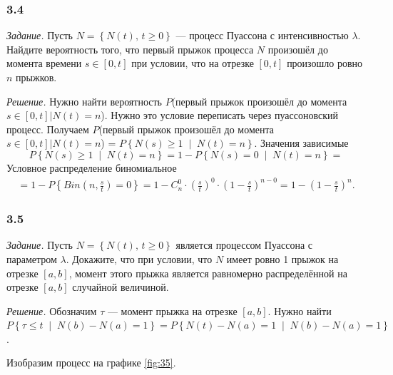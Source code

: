 \subsubsection*{3.4}

\textit{Задание.}
Пусть $N = \left\{ N \left( t \right), \, t \geq 0 \right\} $ ---
процесс Пуассона с интенсивностью $ \lambda $.
Найдите вероятность того, что первый прыжок процесса $N$ произошёл до момента времени
$s \in \left[ 0, t \right] $ при условии,
что на отрезке $ \left[ 0, t \right] $ произошло ровно $n$ прыжков.

\textit{Решение.}
Нужно найти вероятность $P$(первый прыжок произошёл до момента
$\left. s \in \left[ 0, t \right] \right| N \left( t \right) = n$).
Нужно это условие переписать через пуассоновский процесс.
Получаем
$P$(первый прыжок произошёл до момента
  $\left. s \in \left[ 0, t \right] \right| N \left( t \right) = n$) =
  $P \left\{ N \left( s \right) \geq 1 \; \middle| \; N \left( t \right) = n \right\} $.
Значения зависимые
$$P \left\{ N \left( s \right) \geq 1 \; \middle| \; N \left( t \right) = n \right\} =
  1 - P \left\{ N \left( s \right) = 0 \; \middle| \; N \left( t \right) = n \right\} =$$
Условное распределение биномиальное
\begin{gather*}
  = 1 - P \left\{ Bin \left( n, \frac{s}{t} \right) = 0 \right\} =
  1 - C_n^0 \cdot \left( \frac{s}{t} \right)^0 \cdot \left( 1 - \frac{s}{t} \right)^{n - 0} =
  1 - \left( 1 - \frac{s}{t} \right)^n.
\end{gather*}

\subsubsection*{3.5}

\textit{Задание.}
Пусть $N = \left\{ N \left( t \right), \, t \geq 0 \right\} $
является процессом Пуассона с параметром $ \lambda $.
Докажите, что при условии, что $N$ имеет ровно 1 прыжок на отрезке $ \left[ a, b \right] $,
момент этого прыжка является равномерно распределённой на отрезке $ \left[ a, b \right] $
случайной величиной.

\textit{Решение.}
Обозначим $ \tau $ --- момент прыжка на отрезке $ \left[ a, b \right] $.
Нужно найти
$P \left\{ \tau \leq t \; \middle| \; N \left( b \right) - N \left( a \right) = 1 \right\} =
  P \left\{
    N \left( t \right) - N \left( a \right) = 1 \; \middle| \;
    N \left( b \right) - N \left( a \right) = 1 \right\} $.

Изобразим процесс на графике \ref{fig:35}.


